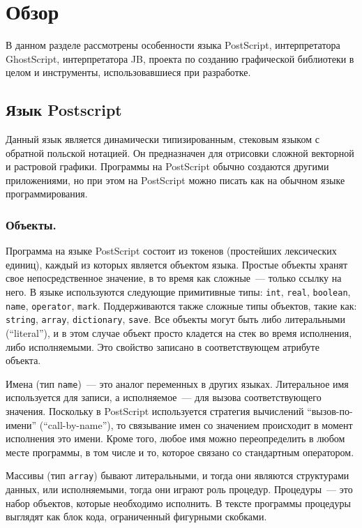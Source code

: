 	\section{Обзор}
	В данном разделе рассмотрены особенности языка PostScript, интерпретатора GhostScript, интерпретатора JB, проекта по созданию графической библиотеки в целом и инструменты, использовавшиеся при разработке.
	\subsection{Язык Postscript}
	Данный язык является динамически типизированным, стековым языком с обратной польской нотацией. Он предназначен для отрисовки сложной векторной и растровой графики. Программы на PostScript обычно создаются другими приложениями, но при этом на PostScript  можно писать как на обычном языке программирования. 
	
	\subsubsection*{Объекты.}	
	Программа на языке PostScript состоит из токенов (простейших лексических единиц), каждый из которых является объектом языка. Простые объекты хранят свое непосредственное значение, в то время как сложные~--- только ссылку на него. В языке используются следующие примитивные типы: \texttt{int}, \texttt{real}, \texttt{boolean}, \texttt{name}, \texttt{operator}, \texttt{mark}. Поддерживаются также сложные типы объектов, такие как: \texttt{string}, \texttt{array}, \texttt{dictionary}, \texttt{save}. Все объекты могут быть либо литеральными (``literal''), и в этом случае объект просто кладется на стек во время исполнения, либо исполняемыми. Это свойство записано в соответствующем атрибуте объекта. 
	
	 Имена (тип \texttt{name})~--- это аналог переменных в других языках. Литеральное имя используется для записи, а исполняемое~--- для вызова соответствующего значения. Поскольку в PostScript используется стратегия вычислений ``вызов-по-имени'' (``call-by-name''), то связывание имен со значением происходит в момент исполнения это имени. Кроме того, любое имя можно переопределить в любом месте программы, в том числе и то, которое связано со стандартным оператором. 
	 
	 Массивы (тип \texttt{array}) бывают литеральными, и тогда они являются структурами данных, или исполняемыми, тогда они играют роль процедур. Процедуры~--- это набор объектов, которые необходимо исполнить. В тексте программы процедуры выглядят как блок кода, ограниченный фигурными скобками.
	 
